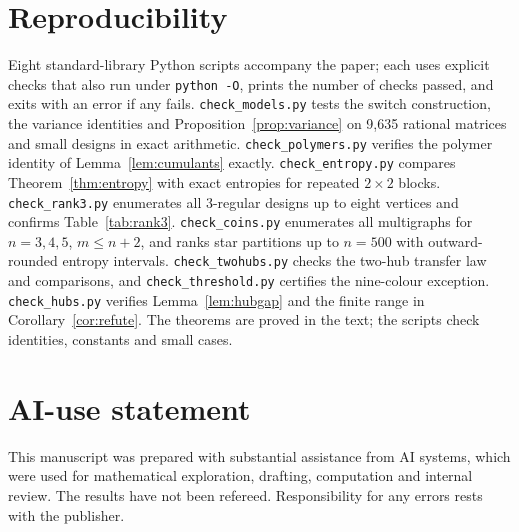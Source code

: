 \documentclass[11pt,a4paper]{article}
\theoremstyle{definition}\newtheorem{remark}[theorem]{Remark}\newtheorem{conjecture}{Conjecture}
\begin{document}
\section*{Reproducibility}
Eight standard-library Python scripts accompany the paper; each uses explicit checks that also run under \texttt{python -O}, prints the number of checks passed, and exits with an error if any fails. \texttt{check\_models.py} tests the switch construction, the variance identities and Proposition~\ref{prop:variance} on 9{,}635 rational matrices and small designs in exact arithmetic. \texttt{check\_polymers.py} verifies the polymer identity of Lemma~\ref{lem:cumulants} exactly. \texttt{check\_entropy.py} compares Theorem~\ref{thm:entropy} with exact entropies for repeated $2\times2$ blocks. \texttt{check\_rank3.py} enumerates all $3$-regular designs up to eight vertices and confirms Table~\ref{tab:rank3}. \texttt{check\_coins.py} enumerates all multigraphs for $n=3,4,5$, $m\le n+2$, and ranks star partitions up to $n=500$ with outward-rounded entropy intervals. \texttt{check\_twohubs.py} checks the two-hub transfer law and comparisons, and \texttt{check\_threshold.py} certifies the nine-colour exception. \texttt{check\_hubs.py} verifies Lemma~\ref{lem:hubgap} and the finite range in Corollary~\ref{cor:refute}. The theorems are proved in the text; the scripts check identities, constants and small cases.

\section*{AI-use statement}
This manuscript was prepared with substantial assistance from AI systems, which were used for mathematical exploration, drafting, computation and internal review. The results have not been refereed. Responsibility for any errors rests with the publisher.
\end{document}
